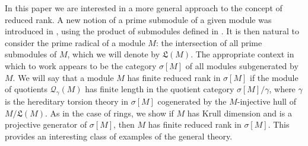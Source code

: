 \documentclass{amsart}
\theoremstyle{definition}
\theoremstyle{remark}
\numberwithin{equation}{section}
\newcommand{\sm}{\sigma[M]}
\begin{document}
	In this paper we are interested 
	in a more general approach to the concept of reduced rank. 
	A new notion of a prime submodule of a given module
	was introduced in \cite{raggiprime},
	using the product of submodules defined in \cite{BicanPr}.
	It is then natural to consider the prime radical of a module $M$: 
	the intersection of all prime submodules of $M$,
	which we will denote by $\mathfrak{L}(M)$. 
	The appropriate context in which to work appears to be
	the category $\sm$ of all modules subgenerated by $M$.
	We will say that a module $M$ has finite reduced rank in $\sm$ 
	if the module of quotients $\mathcal{Q}_\gamma(M)$ 
	has finite length in the quotient category $\sm/\gamma$, 
	where $\gamma$ is the hereditary torsion theory in $\sm$ 
	cogenerated by the $M$-injective hull of $M/\mathfrak{L}(M)$.
	As in the case of rings, 
	we show if $M$ has Krull dimension and is a projective generator of $\sm$,
	then $M$ has finite reduced rank in $\sm$. 
	This provides an interesting class of examples of the general theory.
	
	
\end{document}
